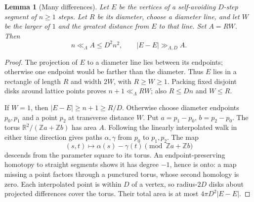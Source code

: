 \documentclass[11pt]{article}
\numberwithin{equation}{section}
\newtheorem{lemma}[theorem]{Lemma}
\theoremstyle{definition}\newtheorem{definition}[theorem]{Definition}
\theoremstyle{remark}\newtheorem{remark}[theorem]{Remark}
\newcommand{\Z}{\mathbb Z}\newcommand{\Q}{\mathbb Q}\newcommand{\R}{\mathbb R}
\newcommand{\abs}[1]{\lvert #1\rvert}
\begin{document}
\begin{lemma}[Many differences]\label{lem:differences}
Let $E$ be the vertices of a self-avoiding $D$-step segment of $n\ge1$ steps. Let $R$ be its diameter, choose a diameter line, and let $W$ be the larger of $1$ and the greatest distance from $E$ to that line. Set $A=RW$. Then
\[
 n\ll_\Lambda A\le D^2n^2,
 \qquad \abs{E-E}\gg_{\Lambda,D} A.
\]
\end{lemma}
\begin{proof}
The projection of $E$ to a diameter line lies between its endpoints; otherwise one endpoint would be farther than the diameter. Thus $E$ lies in a rectangle of length $R$ and width $2W$, with $R\ge W\ge1$. Packing fixed disjoint disks around lattice points proves $n+1\ll_\Lambda RW$; also $R\le Dn$ and $W\le R$.

If $W=1$, then $\abs{E-E}\ge n+1\ge R/D$. Otherwise choose diameter endpoints $p_0,p_1$ and a point $p_2$ at transverse distance $W$. Put $a=p_1-p_0$, $b=p_2-p_0$. The torus $\R^2/(\Z a+\Z b)$ has area $A$. Following the linearly interpolated walk in either time direction gives paths $\alpha,\gamma$ from $p_0$ to $p_1,p_2$. The map
\[
 (s,t)\longmapsto \alpha(s)-\gamma(t)\pmod{\Z a+\Z b}
\]
descends from the parameter square to its torus. An endpoint-preserving homotopy to straight segments shows it has degree $-1$, hence is onto: a map missing a point factors through a punctured torus, whose second homology is zero. Each interpolated point is within $D$ of a vertex, so radius-$2D$ disks about projected differences cover the torus. Their total area is at most $4\pi D^2\abs{E-E}$.
\end{proof}
\end{document}
